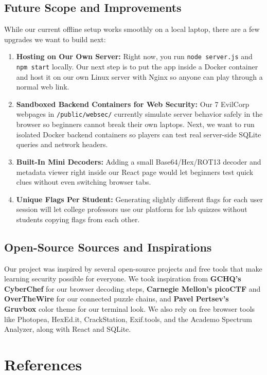 \documentclass[11pt,a4paper]{article}
\begin{document}
\subsection{Future Scope and Improvements}
While our current offline setup works smoothly on a local laptop, there are a few upgrades we want to build next:
\begin{enumerate}
    \item \textbf{Hosting on Our Own Server:} Right now, you run \texttt{node server.js} and \texttt{npm start} locally. Our next step is to put the app inside a Docker container and host it on our own Linux server with Nginx so anyone can play through a normal web link.
    \item \textbf{Sandboxed Backend Containers for Web Security:} Our 7 EvilCorp webpages in \texttt{/public/websec/} currently simulate server behavior safely in the browser so beginners cannot break their own laptops. Next, we want to run isolated Docker backend containers so players can test real server-side SQLite queries and network headers.
    \item \textbf{Built-In Mini Decoders:} Adding a small Base64/Hex/ROT13 decoder and metadata viewer right inside our React page would let beginners test quick clues without even switching browser tabs.
    \item \textbf{Unique Flags Per Student:} Generating slightly different flags for each user session will let college professors use our platform for lab quizzes without students copying flags from each other.
\end{enumerate}

\subsection{Open-Source Sources and Inspirations}
Our project was inspired by several open-source projects and free tools that make learning security possible for everyone. We took inspiration from \textbf{GCHQ's CyberChef} for our browser decoding steps, \textbf{Carnegie Mellon's picoCTF} and \textbf{OverTheWire} for our connected puzzle chains, and \textbf{Pavel Pertsev's Gruvbox} color theme for our terminal look. We also rely on free browser tools like Photopea, HexEd.it, CrackStation, Exif.tools, and the Academo Spectrum Analyzer, along with React and SQLite.

\clearpage

\section*{References}
\end{document}
